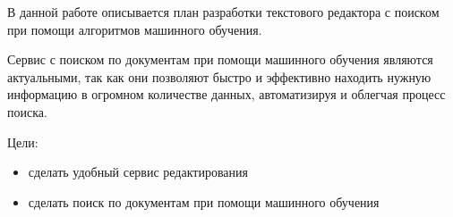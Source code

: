В данной работе описывается план разработки текстового редактора 
с поиском при помощи алгоритмов машинного обучения.

Сервис с поиском по документам при помощи машинного обучения
являются актуальными, так как они позволяют быстро и эффективно
находить нужную информацию в огромном количестве данных,
автоматизируя и облегчая процесс поиска.



Цели:
\begin{itemize}
\item сделать удобный сервис редактирования
\item сделать поиск по документам при помощи машинного обучения
\end{itemize}
